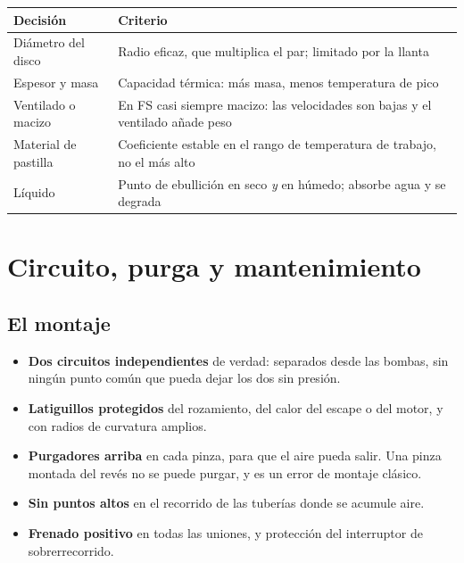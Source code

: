 \begin{center}
\begin{tabularx}{\textwidth}{@{}lX@{}}
\toprule
\textbf{Decisión} & \textbf{Criterio} \\
\midrule
Diámetro del disco & Radio eficaz, que multiplica el par; limitado por la llanta \\
Espesor y masa & Capacidad térmica: más masa, menos temperatura de pico \\
Ventilado o macizo & En FS casi siempre macizo: las velocidades son bajas y el ventilado añade peso \\
Material de pastilla & Coeficiente estable en el rango de temperatura de trabajo, no el más alto \\
Líquido & Punto de ebullición en seco \emph{y} en húmedo; absorbe agua y se degrada \\
\bottomrule
\end{tabularx}
\end{center}

\section{Circuito, purga y mantenimiento}
\label{sec:frenos:05}

\subsection{El montaje}

\begin{itemize}
  \item \textbf{Dos circuitos independientes} de verdad: separados desde las
        bombas, sin ningún punto común que pueda dejar los dos sin presión.
  \item \textbf{Latiguillos protegidos} del rozamiento, del calor del escape o
        del motor, y con radios de curvatura amplios.
  \item \textbf{Purgadores arriba} en cada pinza, para que el aire pueda salir.
        Una pinza montada del revés no se puede purgar, y es un error de montaje
        clásico.
  \item \textbf{Sin puntos altos} en el recorrido de las tuberías donde se
        acumule aire.
  \item \textbf{Frenado positivo} en todas las uniones, y protección del
        interruptor de sobrerrecorrido.
\end{itemize}

